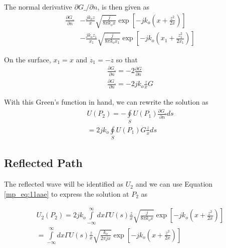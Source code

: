 The normal derivative $\partial G\_/\partial n$, is then given as
\begin{equation}
\begin{aligned}
\frac{\partial G\_}{\partial n}&-\frac{jk_oz}{x}\sqrt{\frac{j}{8\pi k_ox}}\exp\left[-jk_o\left(x + \frac{z^2}{2x}\right) \right] \\
&-\frac{jk_oz_1}{x_1}\sqrt{\frac{j}{8\pi k_ox_1}}\exp\left[-jk_o\left(x_1 + \frac{z_1^2}{2x_1}\right) \right]
\end{aligned}
\label{mp_eq:11aac}
\end{equation}
\renewcommand{\baselinestretch}{2} \small\normalsize

On the surface, $x_1 = x$ and $z_1 = -z$ so that
\begin{equation}
\begin{gathered}
\frac{\partial G\_}{\partial n} = -2\frac{\partial G}{\partial n} \\
\frac{\partial G\_}{\partial n} = -2jk_o\frac{z}{x}G
\end{gathered}
\label{mp_eq:11aad}
\end{equation}
\renewcommand{\baselinestretch}{2} \small\normalsize

With this Green's function in hand, we can rewrite the solution as
\begin{equation}
\begin{gathered}
U(P_2) = -\oint\limits_{S}U(P_1)\frac{\partial G\_}{\partial n}ds\\
= 2jk_o\oint\limits_{S}U(P_1)G\frac{z}{x}ds
\end{gathered}
\label{mp_eq:11aae}
\end{equation}
\renewcommand{\baselinestretch}{2} \small\normalsize

\subsection{Reflected Path}
The reflected wave will be identified as $U_2$ and we can use Equation \ref{mp_eq:11aae} to express the solution at $P_2$ as

\begin{equation}
\begin{gathered}
U_2(P_2) = 2jk_o\int\limits_{-\infty}^{\infty}dx\Gamma U(s)\frac{z}{x}\sqrt{\frac{j}{8\pi k_o x}}\exp\left[-jk_o\left(x +\frac{z^2}{2x} \right) \right] \\
= \int\limits_{-\infty}^{\infty}dx\Gamma U(s)\frac{z}{x}\sqrt{\frac{k_o}{2\pi j x}}\exp\left[-jk_o\left(x +\frac{z^2}{2x} \right) \right] \\
\end{gathered}
\label{mp_eq:11aaf}
\end{equation}
\renewcommand{\baselinestretch}{2} \small\normalsize

